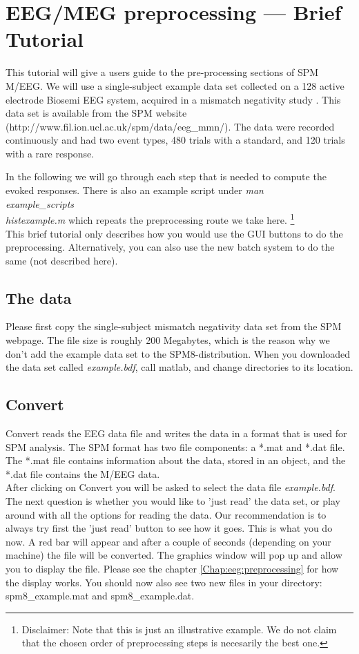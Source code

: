 \chapter{EEG/MEG preprocessing --- Brief Tutorial}
\label{ch:eeg_tutorial}
This tutorial will give a users guide to the pre-processing sections
of SPM M/EEG. We will use a single-subject example data set collected on a 128 active
electrode Biosemi EEG system, acquired in a mismatch negativity study \cite{mg_dcm_repro}. This data set is available from the SPM website (http://www.fil.ion.ucl.ac.uk/spm/data/eeg\_mmn/). The data were recorded continuously and had two event types, 480 trials with a standard, and 120 trials with a rare response.

In the following we will go through each step that is needed to compute the evoked responses. There is also an example script under \textit{man\\example\_scripts\\histexample.m} which repeats the preprocessing route we take here. \footnote{Disclaimer: Note that this is just an illustrative example. We do not claim that the chosen order of preprocessing steps is necesarily the best one.}
\\
This brief tutorial only describes how you would use the GUI buttons to do the preprocessing. Alternatively, you can also use the new batch system to do the same (not described here).

\section{The data}
Please first copy the single-subject mismatch negativity data set from the SPM webpage. The file size is roughly 200 Megabytes, which is the reason why we don't add the example data set to the SPM8-distribution. When you downloaded the data set called \textit{example.bdf}, call matlab, and change directories to its location.

\section{Convert}
Convert reads the EEG data file and writes the data in a format that
is used for SPM analysis. The SPM format has two file components: a *.mat
and *.dat file. The *.mat file contains information about the data, stored in an object, and the *.dat file contains the M/EEG data.\\

After clicking on Convert you will be asked to select the data file \textit{example.bdf}. The next question is whether you would like to 'just read' the data set, or play around with all the options for reading the data. Our recommendation is to always try first the 'just read' button to see how it goes. This is what you do now. A red bar will appear and after a couple of seconds (depending on your machine) the file will be converted. The graphics window will pop up and allow you to display the file. Please see the chapter \ref{Chap:eeg:preprocessing} for how the display works. You should now also see two new files in your directory: spm8\_example.mat and spm8\_example.dat.

